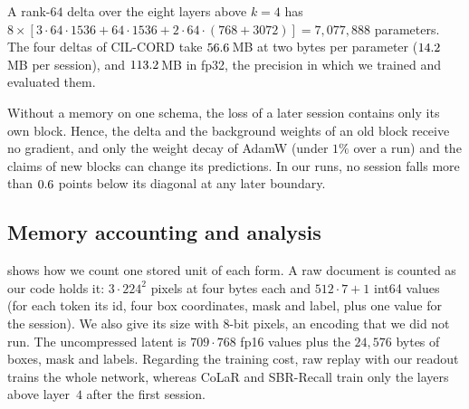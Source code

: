 A rank-$64$ delta over the eight layers above $k{=}4$ has $8\times[3\cdot64\cdot1536+64\cdot1536+2\cdot64\cdot(768{+}3072)]=7{,}077{,}888$ parameters. The four deltas of CIL-CORD take $56.6$\,MB at two bytes per parameter ($14.2$\,MB per session), and $113.2$\,MB in fp32, the precision in which we trained and evaluated them.

 Without a memory on one schema, the loss of a later session contains only its own block. Hence, the delta and the background weights of an old block receive no gradient, and only the weight decay of AdamW (under $1\%$ over a run) and the claims of new blocks can change its predictions. In our runs, no session falls more than $0.6$ points below its diagonal at any later boundary.

\subsection{Memory accounting and analysis}
\label{app:memsec}

\begin{table}[t]
\centering\scriptsize
\setlength{\tabcolsep}{4pt}
\caption{\textbf{Memory accounting} on CIL-CORD ($250$ stored documents, or four deltas; $1$\,MB $=10^6$ bytes). Computed: the size of an encoding that we did not run. Trainable: parameters trained at once after session~1 (SBR-Recall: one delta at a time).}
\label{tab:memory}

\end{table}

  shows how we count one stored unit of each form. A raw document is counted as our code holds it: $3\cdot224^2$ pixels at four bytes each and $512\cdot7{+}1$ int64 values (for each token its id, four box coordinates, mask and label, plus one value for the session). We also give its size with 8-bit pixels, an encoding that we did not run. The uncompressed latent is $709\cdot768$ fp16 values plus the $24{,}576$ bytes of boxes, mask and labels. Regarding the training cost, raw replay with our readout trains the whole network, whereas CoLaR and SBR-Recall train only the layers above layer~$4$ after the first session.

\begin{table}[t]
\centering\small
\setlength{\tabcolsep}{4pt}
\caption{\textbf{Memory comparison on CIL-CORD}: what each method keeps across sessions, its size and its accuracy. $^{k}$Size computed from tensor shapes or parameter counts; the other sizes were recorded by the runs. $^{l}$Not counted in the size. The 8-bit row is the same ER memory counted with 8-bit pixels, an encoding that we did not run.}
\label{tab:memcmp}

\end{table}

